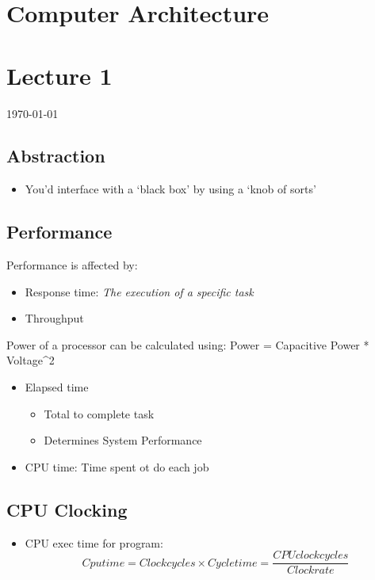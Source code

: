\documentclass[12pt]{article}
\begin{document}
{\centering
\section*{Computer Architecture}
\section*{Lecture 1}
\indent\today
}

\subsection*{Abstraction}
\begin{itemize}
    \item You'd interface with a `black box' by using a `knob of sorts' 
\end{itemize}
\subsection*{Performance}
Performance is affected by:
\begin{itemize}
    \item Response time: \textit{The execution of a specific task}
    \item Throughput
\end{itemize}
\textrm{Power of a processor can be calculated using: \newline}
Power = Capacitive Power * Voltage^2 \newline
\begin{itemize}
    \item Elapsed time
        \begin{itemize}
            \item Total to complete task
            \item Determines System Performance
        \end{itemize}
    \item CPU time: Time spent ot do each job
\end{itemize}

\subsection*{CPU Clocking}
\begin{itemize}
    \item CPU exec time for program:
    \begin{equation}
        Cpu time = Clock cycles \times Cycle time = \frac{CPU clock cycles}{Clock rate}
    \end{equation}
\end{itemize}
\end{document}

